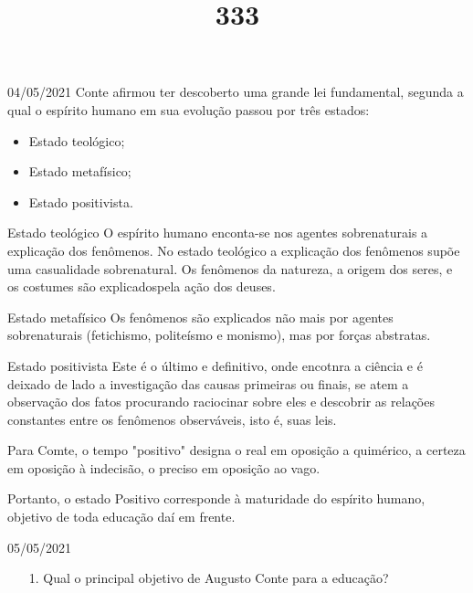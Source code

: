 \documentclass{SchoolBook}
\begin{document}
    \begin{day}{04/05/2021}
        Conte afirmou ter descoberto uma grande lei fundamental, segunda a qual o espírito humano em sua evolução passou por três estados:

        \vspace{6pt}
        \begin{itemize}[nosep]
            \item Estado teológico;
            \item Estado metafísico;
            \item Estado positivista.
        \end{itemize}

        \title{3}{Estado teológico}
        O espírito humano enconta-se nos agentes sobrenaturais a explicação dos fenômenos. No estado teológico a explicação dos fenômenos supõe uma casualidade sobrenatural. Os fenômenos da natureza, a origem dos seres, e os costumes são explicadospela ação dos deuses.

        \title{3}{Estado metafísico}
        Os fenômenos são explicados não mais por agentes sobrenaturais (fetichismo, politeísmo e monismo), mas por forças abstratas.

        \title{3}{Estado positivista}
        Este é o último e definitivo, onde encotnra a ciência e é deixado de lado a investigação das causas primeiras ou finais, se atem a observação dos fatos procurando raciocinar sobre eles e descobrir as relações constantes entre os fenômenos observáveis, isto é, suas leis.
        
        Para Comte, o tempo "positivo" designa o real em oposição a quimérico, a certeza em oposição à indecisão, o preciso em oposição ao vago.
        
        Portanto, o estado Positivo corresponde à maturidade do espírito humano, objetivo de toda educação daí em frente.
    \end{day}
    
    \begin{day}{05/05/2021}
        \begin{enumerate}
            \item[1.] Qual o principal objetivo de Augusto Conte para a educação?
        \end{enumerate}
    \end{day}
\end{document}
